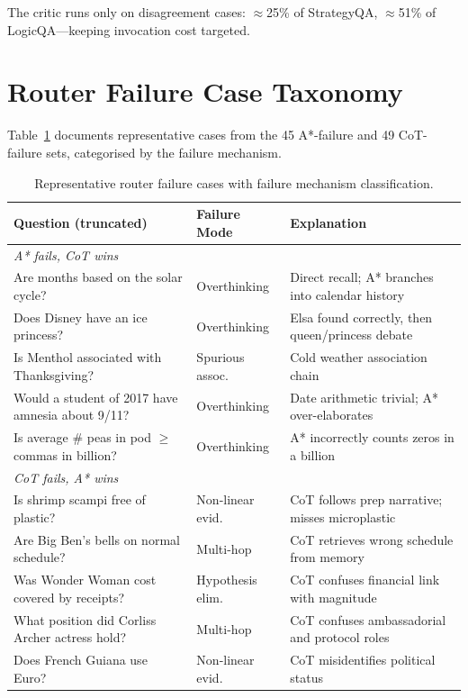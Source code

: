 \documentclass[11pt]{article}
\begin{document}
The critic runs only on disagreement cases: $\approx$25\% of StrategyQA, $\approx$51\% of LogicQA—keeping invocation cost targeted.

\section{Router Failure Case Taxonomy}
\label{app:failures}

Table~\ref{tab:failure_cases} documents representative cases from the 45 A*-failure and 49 CoT-failure sets, categorised by the failure mechanism.

\begin{table}[h]
\centering
\caption{Representative router failure cases with failure mechanism classification.}
\label{tab:failure_cases}
\footnotesize
\begin{tabular}{p{4.5cm}p{2.2cm}p{5cm}}
\toprule
\textbf{Question (truncated)} & \textbf{Failure Mode} & \textbf{Explanation} \\
\midrule
\multicolumn{3}{l}{\textit{A* fails, CoT wins}} \\
Are months based on the solar cycle? & Overthinking & Direct recall; A* branches into calendar history \\
Does Disney have an ice princess? & Overthinking & Elsa found correctly, then queen/princess debate \\
Is Menthol associated with Thanksgiving? & Spurious assoc. & Cold weather association chain \\
Would a student of 2017 have amnesia about 9/11? & Overthinking & Date arithmetic trivial; A* over-elaborates \\
Is average \# peas in pod $\ge$ commas in billion? & Overthinking & A* incorrectly counts zeros in a billion \\
\midrule
\multicolumn{3}{l}{\textit{CoT fails, A* wins}} \\
Is shrimp scampi free of plastic? & Non-linear evid. & CoT follows prep narrative; misses microplastic \\
Are Big Ben's bells on normal schedule? & Multi-hop & CoT retrieves wrong schedule from memory \\
Was Wonder Woman cost covered by receipts? & Hypothesis elim. & CoT confuses financial link with magnitude \\
What position did Corliss Archer actress hold? & Multi-hop & CoT confuses ambassadorial and protocol roles \\
Does French Guiana use Euro? & Non-linear evid. & CoT misidentifies political status \\
\bottomrule
\end{tabular}
\end{table}
\end{document}
